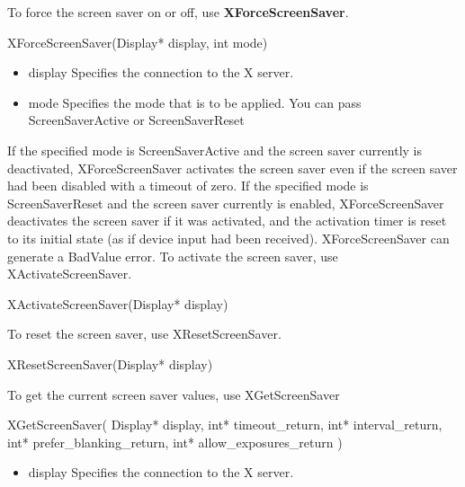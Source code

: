 \documentclass{report}
\begin{document}
\begin{itemize}
            To force the screen saver on or off, use \textbf{XForceScreenSaver}.
            \bigbreak \noindent 
            \begin{cppcode}
            XForceScreenSaver(Display* display, int mode)
            \end{cppcode}
            \bigbreak \noindent
            \begin{itemize}
                \item display Specifies the connection to the X server.
                \item mode Specifies the mode that is to be applied. You can pass ScreenSaverActive or ScreenSaverReset
            \end{itemize}
            If the specified mode is ScreenSaverActive and the screen saver currently is deactivated, XForceScreenSaver activates the screen saver even if the screen saver had been disabled with a timeout of zero. If the specified mode is ScreenSaverReset and the screen saver currently is enabled, XForceScreenSaver deactivates the screen saver if it was activated, and the activation timer is reset to its initial state (as if device input had been received).
            \bigbreak \noindent 
            XForceScreenSaver can generate a BadValue error.
            \bigbreak \noindent 
            To activate the screen saver, use XActivateScreenSaver.
            \begin{cppcode}
                XActivateScreenSaver(Display* display)
            \end{cppcode}
            \bigbreak \noindent 
            To reset the screen saver, use XResetScreenSaver.
            \bigbreak \noindent 
            \begin{cppcode}
                XResetScreenSaver(Display* display)
            \end{cppcode}
            \bigbreak \noindent 
            To get the current screen saver values, use XGetScreenSaver
            \bigbreak \noindent 
            \begin{cppcode}
                XGetScreenSaver(
                    Display* display,
                    int* timeout_return,
                    int* interval_return,
                    int* prefer_blanking_return,
                    int* allow_exposures_return
                )
            \end{cppcode}
            \bigbreak \noindent
            \begin{itemize}
                \item display Specifies the connection to the X server.

\end{itemize}
\end{itemize}
\end{document}
